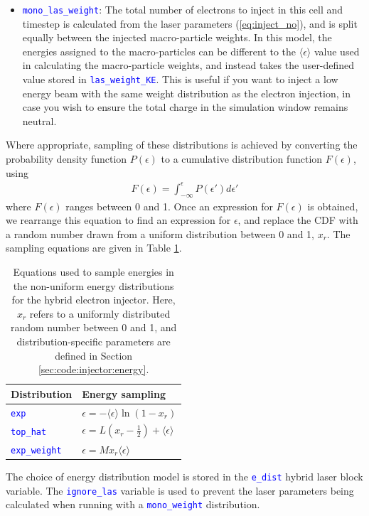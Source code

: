 \documentclass[12pt]{article}
\numberwithin{equation}{section}
\begin{document}
\begin{itemize}
%
  \item \textcolor{blue}{\texttt{mono\_las\_weight}}: The total number of electrons to inject in this cell and timestep is calculated from the laser parameters (\ref{eq:inject_no}), and is split equally between the injected macro-particle weights. In this model, the energies assigned to the macro-particles can be different to the $\langle\epsilon\rangle$ value used in calculating the macro-particle weights, and instead takes the user-defined value stored in \textcolor{blue}{\texttt{las\_weight\_KE}}. This is useful if you want to inject a low energy beam with the same weight distribution as the electron injection, in case you wish to ensure the total charge in the simulation window remains neutral.
  
\end{itemize}

Where appropriate, sampling of these distributions is achieved by converting the probability density function $P(\epsilon)$ to a cumulative distribution function $F(\epsilon)$, using
%
\begin{align} \label{eq:CDF}
  F(\epsilon) = \int_{-\infty}^\epsilon P(\epsilon')d\epsilon'
\end{align}
%
where $F(\epsilon)$ ranges between 0 and 1. Once an expression for $F(\epsilon)$ is obtained, we rearrange this equation to find an expression for $\epsilon$, and replace the CDF with a random number drawn from a uniform distribution between 0 and 1, $x_r$. The sampling equations are given in Table \ref{table:energy_sample}.

\begin{table}[h!]
\centering
\begin{tabular}{l l}
  \toprule
  Distribution & Energy sampling \\
  \midrule 
  \textcolor{blue}{\texttt{exp}} & $\epsilon = -\langle\epsilon\rangle\ln(1-x_r)$ \\
  \textcolor{blue}{\texttt{top\_hat}} & $\epsilon = L\left(x_r-\frac{1}{2}\right) + \langle\epsilon\rangle$ \\
  \textcolor{blue}{\texttt{exp\_weight}} & $\epsilon = Mx_r\langle\epsilon\rangle$ \\
  \bottomrule
\end{tabular}
  \caption{Equations used to sample energies in the non-uniform energy distributions for the hybrid electron injector. Here, $x_r$ refers to a uniformly distributed random number between 0 and 1, and distribution-specific parameters are defined in Section \ref{sec:code:injector:energy}.}
\label{table:energy_sample} 
\end{table}
%
The choice of energy distribution model is stored in the \textcolor{blue}{\texttt{e\_dist}} hybrid laser block variable. The \textcolor{blue}{\texttt{ignore\_las}} variable is used to prevent the laser parameters being calculated when running with a \textcolor{blue}{\texttt{mono\_weight}} distribution.
\end{document}
